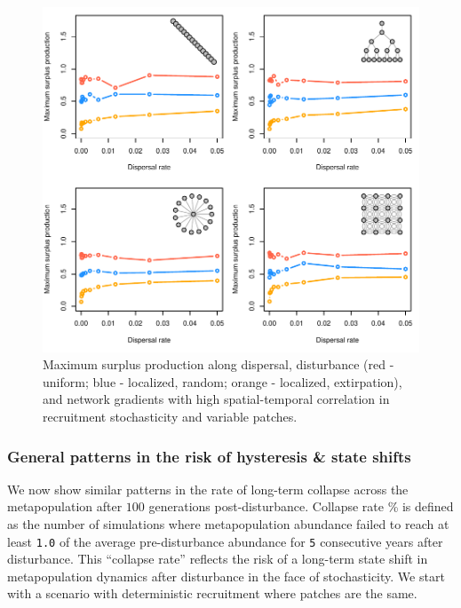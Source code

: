 \documentclass[]{article}
\begin{document}
\begin{figure}[H]

{\centering \includegraphics{Managing_for_ecological_surprises_in_metapopulations_files/figure-latex/MSY with variable patches and space-time stochasticity-1} 

}

\caption{Maximum surplus production along dispersal, disturbance (red - uniform; blue - localized, random; orange - localized, extirpation), and network gradients with high spatial-temporal correlation in recruitment stochasticity and variable patches.}\label{fig:MSY with variable patches and space-time stochasticity}
\end{figure}

\newpage

\hypertarget{general-patterns-in-the-risk-of-hysteresis-state-shifts}{%
\subsubsection{General patterns in the risk of hysteresis \& state
shifts}\label{general-patterns-in-the-risk-of-hysteresis-state-shifts}}

We now show similar patterns in the rate of long-term collapse across
the metapopulation after \(100\) generations post-disturbance. Collapse
rate \% is defined as the number of simulations where metapopulation
abundance failed to reach at least \texttt{1.0} of the average
pre-disturbance abundance for \texttt{5} consecutive years after
disturbance. This ``collapse rate'' reflects the risk of a long-term
state shift in metapopulation dynamics after disturbance in the face of
stochasticity. We start with a scenario with deterministic recruitment
where patches are the same.
\end{document}
